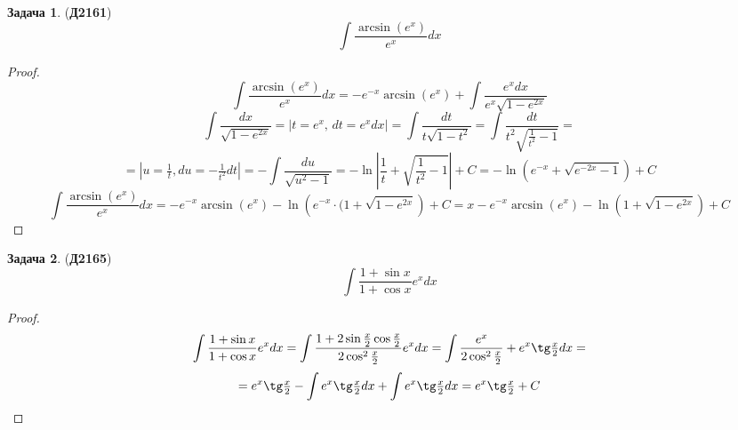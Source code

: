 \documentclass[12pt]{article}
\theoremstyle{definition}
\newtheorem{problem}{Задача}
\DeclareMathOperator{\dint}{\displaystyle\int}
\begin{document}
\begin{problem}(\textbf{Д2161})
	$$
		\dint \dfrac{\arcsin(e^x)}{e^x}dx
	$$
\end{problem}
\begin{proof}
	$$
		\dint \dfrac{\arcsin(e^x)}{e^x}dx = -e^{-x}\arcsin(e^x) + \dint \dfrac{e^xdx}{e^x\sqrt{1 - e^{2x}}}
	$$
	$$
		\dint \dfrac{dx}{\sqrt{1 - e^{2x}}} = |t = e^x, \, dt = e^xdx| = \dint \dfrac{dt}{t\sqrt{1 - t^2}} =\dint \dfrac{dt}{t^2\sqrt{\tfrac{1}{t^2} - 1}} = 
	$$
	$$
		= \left|u = \tfrac{1}{t}, du = -\tfrac{1}{t^2}dt\right|=-\dint \dfrac{du}{\sqrt{u^2 - 1}} =-\ln\left|\dfrac{1}{t} + \sqrt{\dfrac{1}{t^2} - 1} \right| + C = -\ln(e^{-x} + \sqrt{e^{-2x} - 1}) + C
	$$
	$$
		\dint \dfrac{\arcsin(e^x)}{e^x}dx = -e^{-x}\arcsin(e^x) -\ln\left(e^{-x}{\cdot}(1 + \sqrt{1 - e^{2x}}\right) + C = x -e^{-x}\arcsin(e^x) -\ln(1 + \sqrt{1 - e^{2x}}) + C
	$$
\end{proof}

\begin{problem}(\textbf{Д2165})
	$$
		\dint \dfrac{1 + \sin{x}}{1 + \cos{x}}e^xdx
	$$
\end{problem}
\begin{proof}
	$$
		\dint \dfrac{1 + \sin{x}}{1 + \cos{x}}e^xdx = \dint \dfrac{1 + 2\sin\tfrac{x}{2}\cos\tfrac{x}{2}}{2\cos^2\tfrac{x}{2}}e^xdx = \dint \dfrac{e^x}{2\cos^2\tfrac{x}{2}} + e^x\tg\tfrac{x}{2}dx =
	$$
	$$
		=	e^x\tg\tfrac{x}{2} - \dint e^x \tg\tfrac{x}{2}dx  + \dint e^x \tg \tfrac{x}{2}dx = 	e^x\tg\tfrac{x}{2} +C
	$$
\end{proof}
\end{document}
